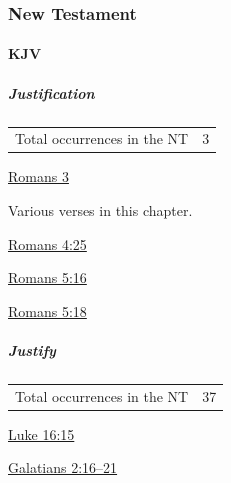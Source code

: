 		
		
	\subsubsection{New Testament} %
		\label{JUSTIFICATION-NT}
	
		\paragraph{KJV}
			\label{JUSTIFICATION-NT-KJV}		
			
			\subparagraph{Justification}
	
				\begin{tabular}{ll}
					Total occurrences in the NT & 3
				\end{tabular}
				
				\begin{compactdesc}
					\item[{\hyperref[ROMANS-3]{Romans 3}}] \phantom{.}
						\begin{compactitem}
							\item Various verses in this chapter.
						\end{compactitem}
					\item[{\hyperref[ROMANS-4-25]{Romans 4:25}}]
					\item[{\hyperref[ROMANS-5-16]{Romans 5:16}}]
					\item[{\hyperref[ROMANS-5-18]{Romans 5:18}}]
				\end{compactdesc}
				
			\subparagraph{Justify}
	
				\begin{tabular}{ll}
					Total occurrences in the NT & 37
				\end{tabular}
				
				\begin{compactdesc}
					\item[{\hyperref[LUKE-16-15]{Luke 16:15}}]
					\item[{\hyperref[GALATIANS-2-16]{Galatians 2:16--21}}]
				\end{compactdesc}
			
